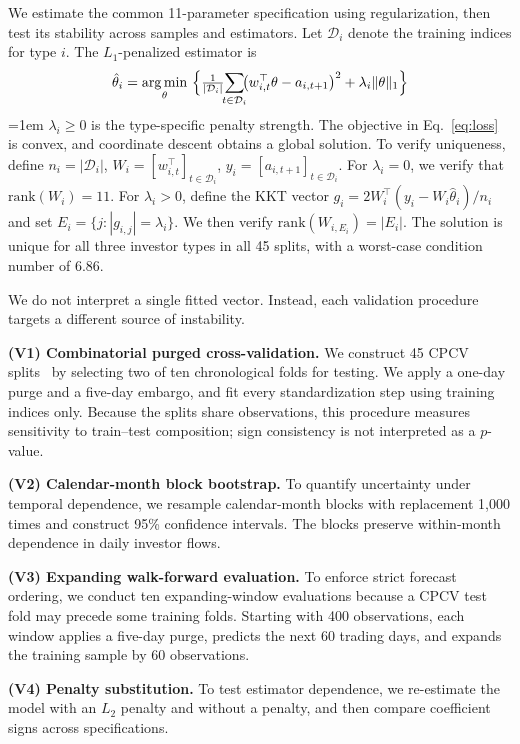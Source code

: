 We estimate the common 11-parameter specification using regularization, then test its
stability across samples and estimators. Let $\mathcal D_i$ denote the training indices for
type $i$. The $L_1$-penalized estimator is
\begin{equation}
\hat\theta_i=\operatorname*{arg\,min}_{\theta}\ \Bigl\{\tfrac{1}{|\mathcal{D}_i|}
\!\!\sum_{t\in\mathcal{D}_i}\!\!\bigl(w_{i,t}^{\top}\theta-a_{i,t+1}\bigr)^{2}
+\lambda_i\lVert\theta\rVert_1\Bigr\}
\label{eq:loss}
\end{equation}
{\emergencystretch=1em
$\lambda_i\ge0$ is the type-specific penalty strength. The objective in
Eq.~\eqref{eq:loss} is convex, and coordinate descent obtains a global solution. To verify
uniqueness, define $n_i=|\mathcal D_i|$,
$W_i=[w_{i,t}^{\top}]_{t\in\mathcal D_i}$,
$y_i=[a_{i,t+1}]_{t\in\mathcal D_i}$. For $\lambda_i=0$, we verify that
$\mathrm{rank}(W_i)=11$. For $\lambda_i>0$, define the KKT vector
$g_i=2W_i^\top(y_i-W_i\hat\theta_i)/n_i$ and set
$E_i=\{j:|g_{i,j}|=\lambda_i\}$. We then verify
$\mathrm{rank}(W_{i,E_i})=|E_i|$. The solution is unique for all three investor types
in all 45 splits, with a worst-case condition number of 6.86.
}

We do not interpret a single fitted vector. Instead, each validation procedure targets a
different source of instability.

\textbf{(V1) Combinatorial purged cross-validation.}
We construct 45 CPCV splits~\cite{lopez2018advances} by selecting two of ten chronological
folds for testing. We apply a one-day purge and a five-day embargo, and
fit every standardization step using training indices only. Because the splits share
observations, this procedure measures sensitivity to train--test composition; sign
consistency is not interpreted as a $p$-value.

\textbf{(V2) Calendar-month block bootstrap.}
To quantify uncertainty under temporal dependence, we resample calendar-month blocks with
replacement 1{,}000 times and construct 95\% confidence intervals. The blocks preserve
within-month dependence in daily investor flows.

\textbf{(V3) Expanding walk-forward evaluation.}
To enforce strict forecast ordering, we conduct ten expanding-window evaluations because a
CPCV test fold may precede some training folds. Starting with 400 observations, each window
applies a five-day purge, predicts the next 60 trading days, and expands the training sample
by 60 observations.

\textbf{(V4) Penalty substitution.}
To test estimator dependence, we re-estimate the model with an $L_2$ penalty and without a
penalty, and then compare coefficient signs across specifications.

